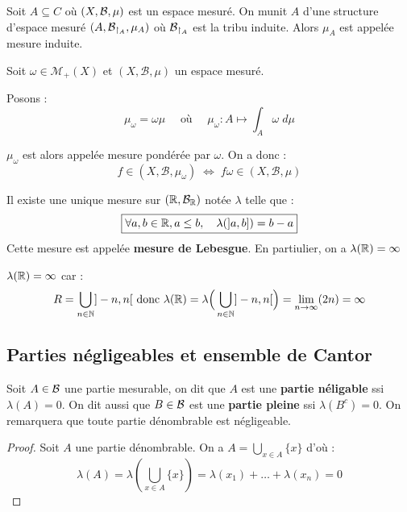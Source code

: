 \begin{definition}
    Soit $A \subseteq C$ où $(X,\mathcal{B},\mu)$ est un espace mesuré. On munit $A$ d'une structure d'espace mesuré $(A, \mathcal{B}_{\restriction _A}, \mu_A)$ où $\mathcal{B}_{\restriction _A}$ est la tribu induite.
    Alors $\mu_A$ est appelée mesure induite.
\end{definition}

\begin{definition}
    Soit $\omega \in \mathcal{M}_+(X)$ et $(X, \mathcal{B},\mu)$ un espace mesuré. 

    Posons : $$ \mu_\omega = \omega \mu \quad \text{ où } \quad \mu_\omega : A \longmapsto \int_A \omega \; d \mu $$

    $\mu_\omega$ est alors appelée mesure pondérée par $\omega$. On a donc : 
        \[ f \in (X, \mathcal{B},\mu_\omega) \; \iff \; f \omega \in (X, \mathcal{B},\mu) \] 
\end{definition}

\begin{theorem}
    Il existe une unique mesure sur $(\mathbb{R}, \mathcal{B}_{\mathbb{R}})$ notée $\lambda$ telle que :
        \[ \boxed{ \forall a,b \in \mathbb{R}, a \leq b, \quad \lambda(]a,b]) = b-a } \] 
    Cette mesure est appelée \textbf{mesure de Lebesgue}. En partiulier, on a $ \lambda (\mathbb{R}) = \infty $ 
\end{theorem}

\begin{remark}
    $\lambda (\mathbb{R}) = \infty$ car :
        \[ R = \bigcup_{n \in \mathbb{N}} ]-n, n[ \text{ donc } \lambda (\mathbb{R}) = \lambda \Big( \bigcup_{n \in \mathbb{N}} ]-n, n[ \Big) = \lim_{n\to\infty} (2n) = \infty \] 
\end{remark}

\subsection{Parties négligeables et ensemble de Cantor}

\begin{definition}
    Soit $A \in \mathcal{B}$ une partie mesurable, on dit que $A$ est une \textbf{partie néligable} ssi $\lambda (A) = 0 $.
    On dit aussi que $B \in \mathcal{B}$ est une \textbf{partie pleine} ssi $\lambda(B ^c) = 0 $.  On remarquera que toute partie dénombrable est négligeable.
\end{definition}

\begin{proof}
    Soit $A$ une partie dénombrable. On a $A = \bigcup_{x\in A} \{ x \}$ d'où :
        \[ \lambda (A) = \lambda \left( \bigcup_{x\in A} \{ x \} \right) = \lambda(x_1) + \dots + \lambda(x_n) = 0 \]
\end{proof}

